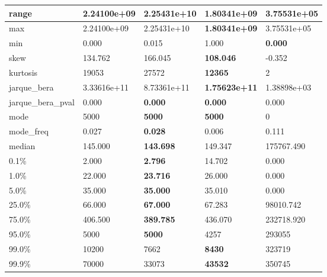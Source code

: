 \begin{table}[H]
\begin{tabular}{|l|m{10em}|m{10em}|m{10em}|m{10em}|}
\hline range & 2.24100e+09 & \cellcolor[rgb]{0.9, 0.54, 0.52} 2.25431e+10 & \bfseries 1.80341e+09 & 3.75531e+05 \\
\hline max & 2.24100e+09 & \cellcolor[rgb]{0.9, 0.54, 0.52} 2.25431e+10 & \bfseries 1.80341e+09 & 3.75531e+05 \\
\hline min & 0.000 & 0.015 & \cellcolor[rgb]{0.9, 0.54, 0.52} 1.000 & \bfseries 0.000 \\
\hline skew & 134.762 & 166.045 & \bfseries 108.046 & \cellcolor[rgb]{0.9, 0.54, 0.52} -0.352 \\
\hline kurtosis & 19053 & 27572 & \bfseries 12365 & \cellcolor[rgb]{0.9, 0.54, 0.52} 2 \\
\hline jarque\_bera & 3.33616e+11 & \cellcolor[rgb]{0.9, 0.54, 0.52} 8.73361e+11 & \bfseries 1.75623e+11 & 1.38898e+03 \\
\hline jarque\_bera\_pval & 0.000 & \bfseries 0.000 & \bfseries 0.000 & \cellcolor[rgb]{0.9, 0.54, 0.52} 0.000 \\
\hline mode & 5000 & \bfseries 5000 & \bfseries 5000 & \cellcolor[rgb]{0.9, 0.54, 0.52} 0 \\
\hline mode\_freq & 0.027 & \bfseries 0.028 & 0.006 & \cellcolor[rgb]{0.9, 0.54, 0.52} 0.111 \\
\hline median & 145.000 & \bfseries 143.698 & 149.347 & \cellcolor[rgb]{0.9, 0.54, 0.52} 175767.490 \\
\hline 0.1\% & 2.000 & \bfseries 2.796 & \cellcolor[rgb]{0.9, 0.54, 0.52} 14.702 & 0.000 \\
\hline 1.0\% & 22.000 & \bfseries 23.716 & 26.000 & \cellcolor[rgb]{0.9, 0.54, 0.52} 0.000 \\
\hline 5.0\% & 35.000 & \bfseries 35.000 & 35.010 & \cellcolor[rgb]{0.9, 0.54, 0.52} 0.000 \\
\hline 25.0\% & 66.000 & \bfseries 67.000 & 67.283 & \cellcolor[rgb]{0.9, 0.54, 0.52} 98010.742 \\
\hline 75.0\% & 406.500 & \bfseries 389.785 & 436.070 & \cellcolor[rgb]{0.9, 0.54, 0.52} 232718.920 \\
\hline 95.0\% & 5000 & \bfseries 5000 & 4257 & \cellcolor[rgb]{0.9, 0.54, 0.52} 293055 \\
\hline 99.0\% & 10200 & 7662 & \bfseries 8430 & \cellcolor[rgb]{0.9, 0.54, 0.52} 323719 \\
\hline 99.9\% & 70000 & 33073 & \bfseries 43532 & \cellcolor[rgb]{0.9, 0.54, 0.52} 350745 \\
\hline
\end{tabular}
\end{table}
